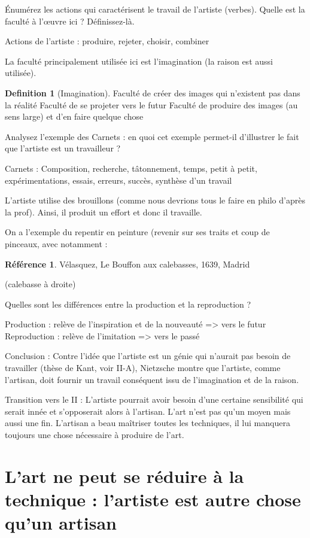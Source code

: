 \documentclass[french]{book}
\theoremstyle{definition}
\newtheorem*{dfn}{Definition}
\newtheorem*{refe}{Référence}
\begin{document}
Énumérez les actions qui caractérisent le travail de l’artiste (verbes). Quelle est la faculté à l'œuvre ici ? Définissez-là.

Actions de l’artiste : produire, rejeter, choisir, combiner

La faculté principalement utilisée ici est l’imagination (la raison est aussi utilisée).

\begin{dfn}[Imagination]
Faculté de créer des images qui n’existent pas dans la réalité
Faculté de se projeter vers le futur
Faculté de produire des images (au sens large) et d’en faire quelque chose
\end{dfn}



Analysez l’exemple des Carnets : en quoi cet exemple permet-il d’illustrer le fait que l’artiste est un travailleur ?

Carnets : Composition, recherche, tâtonnement, temps, petit à petit, expérimentations, essais, erreurs, succès, synthèse d’un travail

L'artiste utilise des brouillons (comme nous devrions tous le faire en philo d’après la prof). Ainsi, il produit un effort et donc il travaille.

On a l’exemple du repentir en peinture (revenir sur ses traits et coup de pinceaux, avec notamment :
\begin{refe}
	Vélasquez, Le Bouffon aux calebasses, 1639, Madrid
\end{refe}
(calebasse à droite)


Quelles sont les différences entre la production et la reproduction ?

Production : relève de l'inspiration et de la nouveauté => vers le futur
Reproduction : relève de l’imitation => vers le passé

Conclusion :
Contre l’idée que l’artiste est un génie qui n’aurait pas besoin de travailler (thèse de Kant, voir II-A), Nietzsche montre que l’artiste, comme l’artisan, doit fournir un travail conséquent issu de l’imagination et de la raison.

Transition vers le II :
L’artiste pourrait avoir besoin d’une certaine sensibilité qui serait innée et s’opposerait alors à l’artisan.
L’art n'est pas qu’un moyen mais aussi une fin.
L’artisan a beau maîtriser toutes les techniques, il lui manquera toujours une chose nécessaire à produire de l’art.

\section{L’art ne peut se réduire à la technique : l’artiste est autre chose qu’un artisan}
\end{document}
